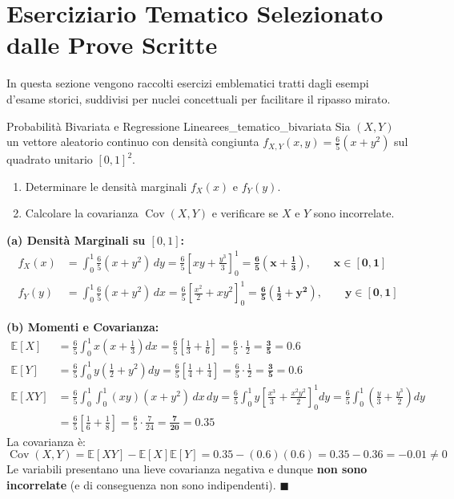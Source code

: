 \section{Eserciziario Tematico Selezionato dalle Prove Scritte}
\label{sec:eserciziario_tematico}

In questa sezione vengono raccolti esercizi emblematici tratti dagli esempi d'esame storici, suddivisi per nuclei concettuali per facilitare il ripasso mirato.

\begin{esercizio}{Probabilità Bivariata e Regressione Lineare}{es_tematico_bivariata}
Sia $(X, Y)$ un vettore aleatorio continuo con densità congiunta $f_{X,Y}(x,y) = \frac{6}{5}(x + y^2)$ sul quadrato unitario $[0,1]^2$.
\begin{enumerate}
    \item[(a)] Determinare le densità marginali $f_X(x)$ e $f_Y(y)$.
    \item[(b)] Calcolare la covarianza $\operatorname{Cov}(X, Y)$ e verificare se $X$ e $Y$ sono incorrelate.
\end{enumerate}
\end{esercizio}

\begin{dimostrazione}
\textbf{(a) Densità Marginali su $[0,1]$:}
\begin{align*}
    f_X(x) &= \int_0^1 \frac{6}{5}(x + y^2) \, dy = \frac{6}{5} \left[ x y + \frac{y^3}{3} \right]_0^1 = \bm{\frac{6}{5}\left(x + \frac{1}{3}\right), \qquad x \in [0,1]} \\
    f_Y(y) &= \int_0^1 \frac{6}{5}(x + y^2) \, dx = \frac{6}{5} \left[ \frac{x^2}{2} + x y^2 \right]_0^1 = \bm{\frac{6}{5}\left(\frac{1}{2} + y^2\right), \qquad y \in [0,1]}
\end{align*}

\textbf{(b) Momenti e Covarianza:}
\begin{align*}
    \mathbb{E}[X] &= \frac{6}{5} \int_0^1 x\left(x + \frac{1}{3}\right) dx = \frac{6}{5}\left[\frac{1}{3} + \frac{1}{6}\right] = \frac{6}{5} \cdot \frac{1}{2} = \bm{\frac{3}{5}} = 0.6 \\
    \mathbb{E}[Y] &= \frac{6}{5} \int_0^1 y\left(\frac{1}{2} + y^2\right) dy = \frac{6}{5}\left[\frac{1}{4} + \frac{1}{4}\right] = \frac{6}{5} \cdot \frac{1}{2} = \bm{\frac{3}{5}} = 0.6 \\
    \mathbb{E}[XY] &= \frac{6}{5} \int_0^1 \int_0^1 (x y)(x + y^2) \, dx \, dy = \frac{6}{5} \int_0^1 y \left[ \frac{x^3}{3} + \frac{x^2 y^2}{2} \right]_0^1 dy = \frac{6}{5} \int_0^1 \left(\frac{y}{3} + \frac{y^3}{2}\right) dy \\
    &= \frac{6}{5} \left[ \frac{1}{6} + \frac{1}{8} \right] = \frac{6}{5} \cdot \frac{7}{24} = \bm{\frac{7}{20}} = 0.35
\end{align*}
La covarianza è:
\begin{equation*}
    \operatorname{Cov}(X, Y) = \mathbb{E}[XY] - \mathbb{E}[X]\mathbb{E}[Y] = 0.35 - (0.6)(0.6) = 0.35 - 0.36 = \bm{-0.01} \neq 0
\end{equation*}
Le variabili presentano una lieve covarianza negativa e dunque \textbf{non sono incorrelate} (e di conseguenza non sono indipendenti). $\blacksquare$
\end{dimostrazione}
